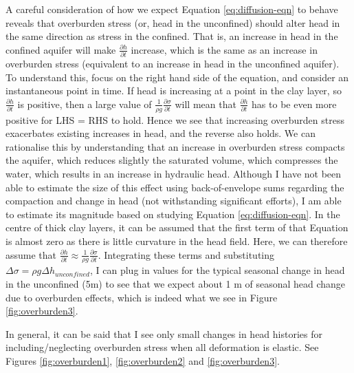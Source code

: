 \documentclass{article}
\begin{document}
A careful consideration of how we expect Equation \ref{eq:diffusion-eqn} to behave reveals that overburden stress (or, head in the unconfined) should alter head in the same direction as stress in the confined. That is, an increase in head in the confined aquifer will make $\frac{\partial{h}}{\partial{t}}$ increase, which is the same as an increase in overburden stress (equivalent to an increase in head in the unconfined aquifer). To understand this, focus on the right hand side of the equation, and consider an instantaneous point in time. If head is increasing at a point in the clay layer, so $\frac{\partial{h}}{\partial{t}}$ is positive, then a large value of $ \frac{1}{\rho g} \frac{\partial \sigma}{\partial t}$ will mean that $\frac{\partial{h}}{\partial{t}}$ has to be even more positive for LHS = RHS to hold. Hence we see that increasing overburden stress exacerbates existing increases in head, and the reverse also holds. We can rationalise this by understanding that an increase in overburden stress compacts the aquifer, which reduces slightly the saturated volume, which compresses the water, which results in an increase in hydraulic head. Although I have not been able to estimate the size of this effect using back-of-envelope sums regarding the compaction and change in head (not withstanding significant efforts), I am able to estimate its magnitude based on studying Equation \ref{eq:diffusion-eqn}. In the centre of thick clay layers, it can be assumed that the first term of that Equation is almost zero as there is little curvature in the head field. Here, we can therefore assume that $  \frac{\partial h}{\partial t} \approx \frac{1}{\rho g} \frac{\partial \sigma}{\partial t} $. Integrating these terms and substituting $ \Delta \sigma = \rho g \Delta h_{unconfined} $, I can plug in values for the typical seasonal change in head in the unconfined (5m) to see that we expect about 1 m of seasonal head change due to overburden effects, which is indeed what we see in Figure \ref{fig:overburden3}.

In general, it can be said that I see only small changes in head histories for including/neglecting overburden stress when all deformation is elastic. See Figures \ref{fig:overburden1}, 
\ref{fig:overburden2} and \ref{fig:overburden3}. 
\end{document}
